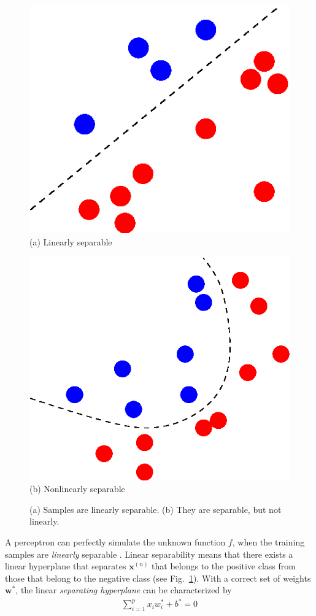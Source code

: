 \documentclass[dissertation,nocontribution]{aaltoseries}
\newcommand{\vect}[1]{\mathbf{#1}}
\newcommand{\vx}[0]{\vect{x}}
\newcommand{\vw}[0]{\vect{w}}
\begin{document}
\begin{figure}[t]
    \begin{minipage}{0.48\textwidth}
        \centering
        \includegraphics[width=0.75\columnwidth]{figures/linsep.eps}
        \\
        \small
        (a) Linearly separable
    \end{minipage}
    \begin{minipage}{0.48\textwidth}
        \centering
        \includegraphics[width=0.75\columnwidth]{figures/nonlinsep.eps}
        \\
        \small
        (b) Nonlinearly separable
    \end{minipage}
    \caption{(a)
    Samples are linearly separable. (b) They are separable,
    but not linearly.}
    \label{fig:linsep}
\end{figure}

A perceptron can perfectly simulate the unknown function
$f$, when the training samples are \textit{linearly}
separable \citep{Minsky1969}.  Linear separability means that
there exists a linear hyperplane that separates $\vx^{(n)}$
that belongs to the positive class from those that belong to
the negative class (see Fig.~\ref{fig:linsep}). With a
correct set of weights $\vw^*$, the linear
\textit{separating hyperplane} can be characterized by
\begin{align*}
    \sum_{i=1}^p x_i w_i^* + b^* = 0
\end{align*}
\end{document}
